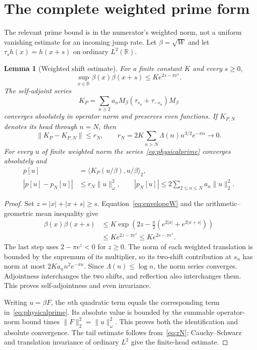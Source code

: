 \documentclass[11pt,a4paper]{article}
\numberwithin{equation}{section}
\newtheorem{lemma}[theorem]{Lemma}
\theoremstyle{definition}
\theoremstyle{remark}
\newcommand{\R}{\mathbb R}
\newcommand{\ip}[2]{\langle #1,#2\rangle}
\newcommand{\norm}[1]{\lVert #1\rVert}
\begin{document}
\section{The complete weighted prime form}\label{sec:prime}

The relevant prime bound is in the numerator's weighted norm, not a uniform vanishing estimate for an incoming jump rate. Let $\beta=\sqrt W$ and let $\tau_sh(x)=h(x+s)$ on ordinary $L^2(\R)$.

\begin{lemma}[Weighted shift estimate]\label{lem:prime}
For a finite constant $K$ and every $s\ge0$,
\begin{equation}\label{eq:betaprod}
 \sup_{x\in\R}\beta(x)\beta(x+s)\le K e^{2s-\pi e^s}.
\end{equation}
The self-adjoint series
\begin{equation}\label{eq:KP}
 K_P=\sum_{n\ge2}a_nM_\beta(\tau_{s_n}+\tau_{-s_n})M_\beta
\end{equation}
converges absolutely in operator norm and preserves even functions. If $K_{P,N}$ denotes its head through $n=N$, then
\begin{equation}\label{eq:rN}
 \norm{K_P-K_{P,N}}\le r_N,
 \qquad r_N=2K\sum_{n>N}\Lambda(n)n^{3/2}e^{-\pi n}\longrightarrow0.
\end{equation}
For every $u$ of finite weighted norm the series~\eqref{eq:physicalprime} converges absolutely and
\begin{align}
 p[u]&=\ip{K_P(u/\beta)}{u/\beta}_2,\label{eq:prepresentation}\\
 |p[u]-p_N[u]|&\le r_N\norm{u}_\omega^2,\qquad
 |p_N[u]|\le2\sum_{2\le n\le N}a_n\norm{u}_2^2.\label{eq:headtail}
\end{align}
\end{lemma}
\begin{proof}
Set $z=|x|+|x+s|\ge s$. Equation~\eqref{eq:envelopeW} and the arithmetic--geometric mean inequality give
\begin{align*}
 \beta(x)\beta(x+s)
 &\le K\exp\!\left(2z-\frac\pi2(e^{2|x|}+e^{2|x+s|})\right)\\
 &\le K e^{2z-\pi e^z}\le K e^{2s-\pi e^s}.
\end{align*}
The last step uses $2-\pi e^z<0$ for $z\ge0$. The norm of each weighted translation is bounded by the supremum of its multiplier, so its two-shift contribution at $s_n$ has norm at most $2Ka_nn^2e^{-\pi n}$. Since $\Lambda(n)\le\log n$, the norm series converges. Adjointness interchanges the two shifts, and reflection also interchanges them. This proves self-adjointness and even invariance.

Writing $u=\beta F$, the $n$th quadratic term equals the corresponding term in~\eqref{eq:physicalprime}. Its absolute value is bounded by the summable operator-norm bound times $\norm{F}_2^2=\norm{u}_\omega^2$. This proves both the identification and absolute convergence. The tail estimate follows from~\eqref{eq:rN}; Cauchy--Schwarz and translation invariance of ordinary $L^2$ give the finite-head estimate.
\end{proof}
\end{document}
